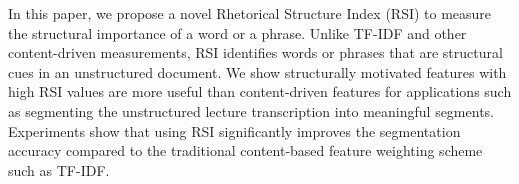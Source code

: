 In this paper, we propose a novel Rhetorical Structure Index (RSI) to measure  the structural importance of a word or a
 phrase.
 Unlike TF-IDF and other content-driven measurements, RSI  identifies words or
 phrases that are structural cues in an unstructured document.
 We show  structurally motivated features with high RSI values are more useful
 than content-driven features for applications such as segmenting the
 unstructured lecture transcription into meaningful segments. Experiments show
 that using RSI significantly improves the segmentation accuracy  compared to
 the traditional content-based feature weighting scheme such as TF-IDF.

